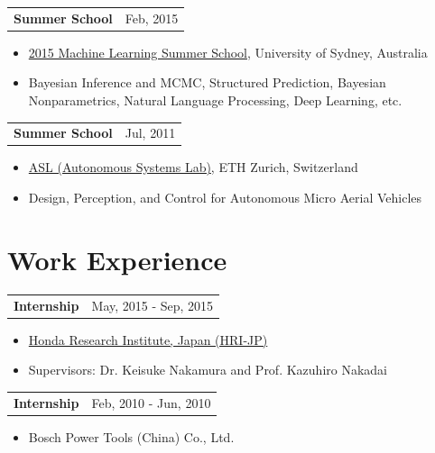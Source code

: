 \documentclass[margin,line]{res}
\begin{document}
\begin{resume}
\begin{tabularx}{\textwidth}{X r}
{\bf Summer School} & Feb, 2015\\
\end{tabularx}
\begin{itemize}
\item[] \href{http://rp-www.cs.usyd.edu.au/~mlss/}{2015 Machine Learning Summer School}, University of Sydney, Australia

\vspace*{-2.5mm}
\item[] Bayesian Inference and MCMC, Structured Prediction, Bayesian Nonparametrics, Natural Language Processing, Deep Learning, etc.
\end{itemize}

\begin{tabularx}{\textwidth}{X r}
{\bf Summer School} & Jul, 2011\\
\end{tabularx}
\begin{itemize}
\item[] \href{http://www.asl.ethz.ch}{ASL (Autonomous Systems Lab)}, ETH Zurich, Switzerland

\vspace*{-2.5mm}
\item[] Design, Perception, and Control for Autonomous Micro Aerial Vehicles
\end{itemize}

\section{\sc Work Experience}

\begin{tabularx}{\textwidth}{X r}
{\bf Internship} & May, 2015 - Sep, 2015\\
\end{tabularx}
\begin{itemize}
\item[] \href{http://www.jp.honda-ri.com/english}{Honda Research Institute, Japan (HRI-JP)}

\vspace*{-2.5mm}
\item[] Supervisors: Dr. Keisuke Nakamura and Prof. Kazuhiro Nakadai
\end{itemize}

\begin{tabularx}{\textwidth}{X r}
{\bf Internship} & Feb, 2010 - Jun, 2010\\
\end{tabularx}
\begin{itemize}
\item[] Bosch Power Tools (China) Co., Ltd.


\end{itemize}
\end{resume}
\end{document}
